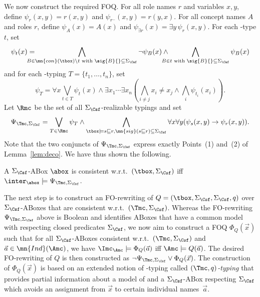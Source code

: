 \documentclass{lmcs}
\theoremstyle{definition}
\begin{document}
  We now construct the required FOQ. For all role names $r$ and
  variables $x,y$, define $\psi_r(x,y)=r(x,y)$ and
  $\psi_{r^-}(x,y)=r(y,x)$.  For all concept names $A$ and roles $r$,
  define $\psi_A(x)=A(x)$ and $\psi_{\exists r}(x)=\exists
  y\,\psi_r(x,y)$. For each \Tmc-type $t$, set
  $$\psi_t(x)=\hspace*{-5mm}
  \bigwedge_{B\in \mn{con}(\tbox)\setminus t \text{ with
    }\sig{B}{}\subseteq\Sigma_{\Csf} }\neg\psi_B(x)\land \hspace*{-4mm}
  \bigwedge_{B\in t\text{ with }\sig{B}{}\subseteq\Sigma_{\Csf}}\psi_B(x)$$
  and for each \Tmc-typing $T=\{t_1,\dots,t_n\}$, set
  $$\psi_T=\forall x\bigvee_{t\in T}\psi_{t}(x)\land \exists
  x_1\cdots\exists x_n(\bigwedge_{i\neq j} x_i \neq x_j\land
  \bigwedge_i\psi_{t_i}(x_i) ).
  $$
  Let $\Rmc$ be the set of all $\Sigma_{\Csf}$-realizable typings and set
  $$
  \Psi_{\Tmc,\Sigma_{\Csf}} = \bigvee_{T\in\Rmc}\psi_T \wedge
  \bigwedge_{\tbox\models s\sqsubseteq r, \mn{sig}(s\sqsubseteq r)\subseteq\Sigma_{\Csf}}\forall x\forall
  y(\psi_s(x,y)\rightarrow \psi_r(x,y)).
  $$
%  
  Note that the two conjuncts of $\Psi_{\Tmc,\Sigma_{\Csf}}$ express exactly
  Points~(1) and~(2) of Lemma~\ref{lem:deco}.  We have thus shown
  the following.
  \begin{prop}
	A $\Sigma_{\Csf}$-ABox $\abox$ is consistent w.r.t.\ $(\tbox,\Sigma_{\Csf})$ iff 
	$\inter_\abox \models \Psi_{\Tmc,\Sigma_{\Csf}}$.
  \end{prop}
  The next step is to construct an FO-rewriting of 
  $Q=(\tbox,\Sigma_{\Csf},\Sigma_{\Csf},q)$ over $\Sigma_{\Csf}$-ABoxes that are 
  consistent w.r.t.~$(\Tmc,\Sigma_{\Csf})$. Whereas the FO-rewriting $\Psi_{\Tmc,\Sigma_{\Csf}}$ above is Boolean and
  identifies ABoxes that have a common model with \Tmc respecting closed predicates $\Sigma_{\Csf}$, we now aim to
  construct a FOQ $\Phi_{Q}(\vec{x})$ such that for all
  $\Sigma_{\Csf}$-ABoxes \Amc consistent w.r.t.~$(\Tmc,\Sigma_{\Csf})$ and $\vec{a} \in \mn{Ind}(\Amc)$, we have
  $\Imc_\Amc \models \Phi_{Q}(\vec{a})$ iff $\Amc \models Q(\vec{a})$. The desired FO-rewriting
  of $Q$ is then constructed as $\neg\Psi_{\Tmc,\Sigma_{\Csf}} \vee \Phi_Q(\vec{x})$.
  The construction of $\Phi_{Q}(\vec{x})$ is
  based on an extended notion of \Tmc-typing called
  \emph{$(\Tmc,q)$-typing} that provides partial information about a
  model \Imc of
  \Tmc and a $\Sigma_{\Csf}$-ABox \Amc respecting $\Sigma_{\Csf}$ which avoids an assignment from
  $\vec{x}$ to certain individual names~$\vec{a}$.
  
\end{document}
